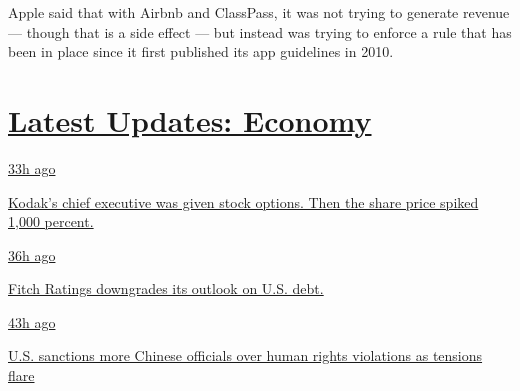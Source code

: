 Apple said that with Airbnb and ClassPass, it was not trying to generate
revenue --- though that is a side effect --- but instead was trying to
enforce a rule that has been in place since it first published its app
guidelines in 2010.

\hypertarget{latest-updates-economy}{%
\section{\texorpdfstring{\href{https://www.nytimes.com/live/2020/07/31/business/stock-market-today-coronavirus?action=click\&pgtype=Article\&state=default\&region=MAIN_CONTENT_1\&context=storylines_live_updates}{Latest
Updates:
Economy}}{Latest Updates: Economy}}\label{latest-updates-economy}}

\href{https://www.nytimes.com/live/2020/07/31/business/stock-market-today-coronavirus?action=click\&pgtype=Article\&state=default\&region=MAIN_CONTENT_1\&context=storylines_live_updates\#kodaks-chief-executive-was-given-stock-options-then-the-share-price-spiked-1000-percent}{33h
ago}

\href{https://www.nytimes.com/live/2020/07/31/business/stock-market-today-coronavirus?action=click\&pgtype=Article\&state=default\&region=MAIN_CONTENT_1\&context=storylines_live_updates\#kodaks-chief-executive-was-given-stock-options-then-the-share-price-spiked-1000-percent}{Kodak's
chief executive was given stock options. Then the share price spiked
1,000 percent.}

\href{https://www.nytimes.com/live/2020/07/31/business/stock-market-today-coronavirus?action=click\&pgtype=Article\&state=default\&region=MAIN_CONTENT_1\&context=storylines_live_updates\#fitch-ratings-downgrades-its-outlook-on-us-debt}{36h
ago}

\href{https://www.nytimes.com/live/2020/07/31/business/stock-market-today-coronavirus?action=click\&pgtype=Article\&state=default\&region=MAIN_CONTENT_1\&context=storylines_live_updates\#fitch-ratings-downgrades-its-outlook-on-us-debt}{Fitch
Ratings downgrades its outlook on U.S. debt.}

\href{https://www.nytimes.com/live/2020/07/31/business/stock-market-today-coronavirus?action=click\&pgtype=Article\&state=default\&region=MAIN_CONTENT_1\&context=storylines_live_updates\#us-sanctions-more-chinese-officials-over-human-rights-violations-as-tensions-flare}{43h
ago}

\href{https://www.nytimes.com/live/2020/07/31/business/stock-market-today-coronavirus?action=click\&pgtype=Article\&state=default\&region=MAIN_CONTENT_1\&context=storylines_live_updates\#us-sanctions-more-chinese-officials-over-human-rights-violations-as-tensions-flare}{U.S.
sanctions more Chinese officials over human rights violations as
tensions flare}

